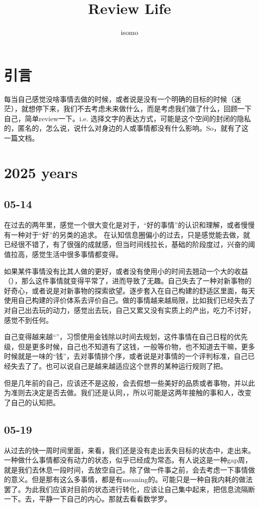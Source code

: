 \documentclass{article}
\title{Review Life}
\author{isomo}
\begin{document}
\maketitle

\section{引言}

每当自己感觉没啥事情去做的时候，或者说是没有一个明确的目标的时候（迷茫），就想停下来，我们不去考虑未来做什么，而是考虑我们做了什么，回顾一下自己，简单review一下。i.e. 选择文字的表达方式，可能是这个空间的封闭的隐私的，匿名的，怎么说，说什么对身边的人或事情都没有什么影响。So，就有了这一篇文档。

\section{2025 years}

\subsection{05-14}

在过去的两年里，感觉一个很大变化是对于，“好的事情”的认识和理解，或者慢慢有一种对于“好”的另类的追求。
在认知信息圈偏小的过去，只是感觉能去做，就已经很不错了，有了很强的成就感，但当时间线拉长，基础的阶段度过，兴奋的阈值拉高，感觉生活中很多事情都变得。

如果某件事情没有比其人做的更好，或者没有使用小的时间去翘动一个大的收益（），那么这件事情就变得平常了，进而导致了无趣。自己失去了一种对新事物的好奇心，或者说是对新事物的探索欲望。逐步套入在自己构建的舒适区里面，每天使用自己构建的评价体系去评价自己。做的事情越来越局限，比如我们已经失去了对自己出去玩的动力，感觉出去玩，自己又累又没有实质上的产出，吃力不讨好，感觉不到任何。

自己变得越来越“”，习惯使用金钱除以时间去规划，这件事情在自己日程的优先级，但是更多时候，自己也不知道有了这钱，一般等价物，也不知道去干嘛，更多时候就是一味的“钱”，去对事情排个序，或者说是对事情的一个评判标准，自己已经失去了了。也可以说自己是越来越适应这个世界的某种运行规则了把。

但是几年前的自己，应该还不是这般，会去假想一些美好的品质或者事物，并以此为准则去决定是否去做。我们还是认同，，所以可能是这两年接触的事和人，改变了自己的认知把。

\subsection{05-19}

从过去的快一周时间里面，来看，我们还是没有走出丢失目标的状态中，走出来。一种做什么事情都没有动力的状态，似乎已经成为常态。有人说这是一种gap周，就是我们去休息一段时间，去放空自己。除了做一件事之前，会去考虑一下事情做的意义。但是那有这么多事情，都是有meaning的。可能只是一种自我内耗的做法罢了。为此我们应该对目前的状态进行转化，应该让自己集中起来，把信息流隔断一下。去，平静一下自己的内心。那就去看看数学罗。

% 
% 
\end{document}
